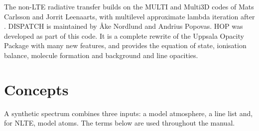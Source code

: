 \documentclass[paper=a4, fontsize=10pt]{scrartcl}
\numberwithin{equation}{section}		%
\numberwithin{figure}{section}			%
\numberwithin{table}{section}				%
\begin{document}
The non-LTE radiative transfer builds on the MULTI and Multi3D codes of Mats Carlsson and Jorrit Leenaarts, with multilevel approximate lambda iteration after \citet{RybickiHummer1992}. DISPATCH is maintained by {\AA}ke Nordlund and Andrius Popovas. HOP was developed as part of this code. It is a complete rewrite of the Uppsala Opacity Package \citep{GustafssonBell1975} with many new features, and provides the equation of state, ionisation balance, molecule formation and background and line opacities.

\section{Concepts}\label{sec:concepts}

A synthetic spectrum combines three inputs: a model atmosphere, a line list and, for NLTE, model atoms. The terms below are used throughout the manual.
\end{document}
